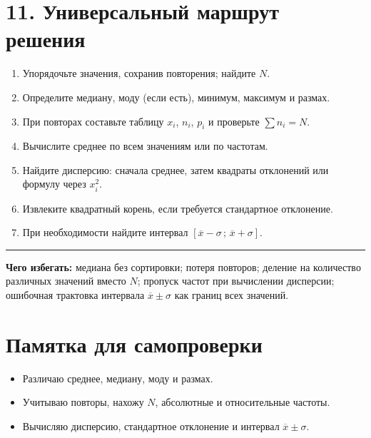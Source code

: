 \documentclass[a4paper,12pt]{article}
\newcommand{\mysection}[1]{\vspace{5pt}\section*{\textcolor{darkaccent}{#1}}\vspace{-5pt}}
\newcommand{\xbar}{\overline{x}}
\begin{document}
\mysection{11. Универсальный маршрут решения}
\begin{enumerate}[label=\textcolor{darkaccent}{\arabic*.},itemsep=3pt]
\item Упорядочьте значения, сохранив повторения; найдите $N$.
\item Определите медиану, моду (если есть), минимум, максимум и размах.
\item При повторах составьте таблицу $x_i$, $n_i$, $p_i$ и проверьте $\sum n_i=N$.
\item Вычислите среднее по всем значениям или по частотам.
\item Найдите дисперсию: сначала среднее, затем квадраты отклонений или формулу через $x_i^2$.
\item Извлеките квадратный корень, если требуется стандартное отклонение.
\item При необходимости найдите интервал $[\xbar-\sigma\,;\,\xbar+\sigma]$.
\end{enumerate}
\par\smallskip\hrule\smallskip
\textbf{Чего избегать:} медиана без сортировки; потеря повторов; деление на количество различных значений вместо $N$; пропуск частот при вычислении дисперсии; ошибочная трактовка интервала $\xbar\pm\sigma$ как границ всех значений.

\mysection{Памятка для самопроверки}
\begin{itemize}
\item[$\square$] Различаю среднее, медиану, моду и размах.
\item[$\square$] Учитываю повторы, нахожу $N$, абсолютные и относительные частоты.
\item[$\square$] Вычисляю дисперсию, стандартное отклонение и интервал $\xbar\pm\sigma$.
\end{itemize}
\end{document}
